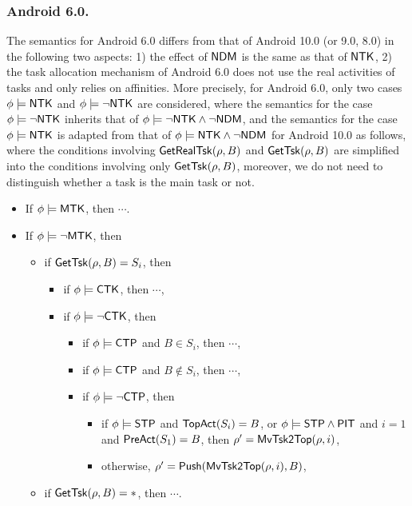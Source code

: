 \subsubsection{Android 6.0.}
The semantics for Android 6.0 differs from that of Android 10.0 (or 9.0, 8.0) in the following two aspects: 1) the effect of ${\sf NDM}$ is the same as that of ${\sf NTK}$, 2) the task allocation mechanism of Android 6.0 does not use the real activities of tasks and only relies on affinities. 
%
More precisely, for Android 6.0, only two cases $\phi \models {\sf NTK}$ and $\phi  \models \neg {\sf NTK}$ are considered, where
the semantics for the case $\phi  \models \neg {\sf NTK}$ inherits that of $\phi \models \neg {\sf NTK} \wedge \neg {\sf NDM}$, 
and the semantics for the case $\phi \models {\sf NTK}$ is adapted from that of $\phi \models {\sf NTK} \wedge \neg {\sf NDM}$ for Android 10.0 as follows, where the conditions involving $\mathsf{GetRealTsk}(\rho, B)$ and $\mathsf{GetTsk}(\rho, B)$ are simplified into the conditions involving only $\mathsf{GetTsk}(\rho, B)$, moreover, we do not need to distinguish whether a task is the main task or not.  
\begin{itemize}
\item If $\phi \models {\sf MTK}$, then $\cdots$.
%
\item If $\phi \models \neg {\sf MTK}$, then
	\begin{itemize}
        \item if $\mathsf{GetTsk}(\rho,B) = S_i$, then
		\begin{itemize}
			\item if $\phi \models {\sf CTK}$, then $\cdots$,
			\item if $\phi \models \neg {\sf CTK}$, then
			\begin{itemize}
				\item if $\phi \models {\sf CTP}$ and $B \in S_i$, then $\cdots$,
				\item if $\phi \models {\sf CTP}$ and $B \notin S_i$, then $\cdots$,
				\item if $\phi \models \neg {\sf CTP}$, then
				\begin{itemize}
                    \item if $\phi \models {\sf STP}$ and $\mathsf{TopAct}(S_i) = B$, or $\phi \models {\sf STP} \wedge {\sf PIT}$ and $i = 1$ and $\mathsf{PreAct}(S_1) = B$, then $\rho' = \mathsf{MvTsk2Top}(\rho, i)$,
                    \item otherwise, $\rho'=\mathsf{Push}(\mathsf{MvTsk2Top}(\rho, i), B)$,
				\end{itemize}
			\end{itemize}
		\end{itemize}
	\item if $\mathsf{GetTsk}(\rho, B) = *$, then $\cdots$.
	\end{itemize}
\end{itemize}
